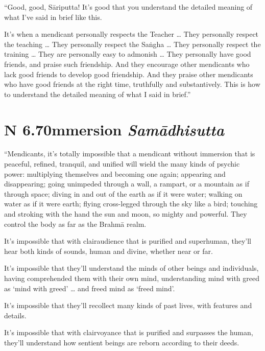 \documentclass[12pt,openany]{book}%
\newcommand*{\suttatitleacronym}[1]{\smaller[2]{#1}\vspace*{.3em}}
\newcommand*{\suttatitletranslation}[1]{\linebreak{#1}}
\newcommand*{\suttatitleroot}[1]{\linebreak\smaller[2]\itshape{#1}}
\newcommand*{\tocacronym}[1]{\hspace*{-3.3em}{#1}\quad}
\newcommand*{\toctranslation}[1]{#1}
\newcommand*{\tocroot}[1]{(\textit{#1})}
\begin{document}
“Good, good, \textsanskrit{Sāriputta}! It’s good that you understand the detailed meaning of what I’ve said in brief like this. 

It’s when a mendicant personally respects the Teacher … They personally respect the teaching … They personally respect the \textsanskrit{Saṅgha} … They personally respect the training … They are personally easy to admonish … They personally have good friends, and praise such friendship. And they encourage other mendicants who lack good friends to develop good friendship. And they praise other mendicants who have good friends at the right time, truthfully and substantively. This is how to understand the detailed meaning of what I said in brief.” 

%
\section*{{\suttatitleacronym AN 6.70}{\suttatitletranslation Immersion }{\suttatitleroot Samādhisutta}}
\addcontentsline{toc}{section}{\tocacronym{AN 6.70} \toctranslation{Immersion } \tocroot{Samādhisutta}}

“Mendicants, it’s totally impossible that a mendicant without immersion that is peaceful, refined, tranquil, and unified will wield the many kinds of psychic power: multiplying themselves and becoming one again; appearing and disappearing; going unimpeded through a wall, a rampart, or a mountain as if through space; diving in and out of the earth as if it were water; walking on water as if it were earth; flying cross-legged through the sky like a bird; touching and stroking with the hand the sun and moon, so mighty and powerful. They control the body as far as the \textsanskrit{Brahmā} realm. 

It’s impossible that with clairaudience that is purified and superhuman, they’ll hear both kinds of sounds, human and divine, whether near or far. 

It’s impossible that they’ll understand the minds of other beings and individuals, having comprehended them with their own mind, understanding mind with greed as ‘mind with greed’ … and freed mind as ‘freed mind’. 

It’s impossible that they’ll recollect many kinds of past lives, with features and details. 

It’s impossible that with clairvoyance that is purified and surpasses the human, they’ll understand how sentient beings are reborn according to their deeds. 
\end{document}
